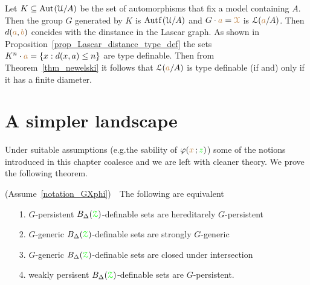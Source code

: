 

\begin{example}
  Let $K\subseteq{\rm Aut\kern.15ex}(\EuScript U/A)$ be the set of automorphisms that fix a model containing $A$.
  Then the group $G$  generated by $K$ is $\mathord{\rm Aut\kern.15ex{f}\kern.15ex}(\EuScript U/A)$ and $G\cdot{\color{brown}a}={\color{brown}\EuScript X}$ is $\EuScript L({\color{brown} a}/A)$.
  Then $d({\color{brown} a},{\color{brown} b})$ concides with the dinstance in the Lascar graph.
  As shown in Proposition~\ref{prop_Lascar_distance_type_def} the sets $K^n\cdot{\color{brown}a}=\{x:d(x,a)\le n\}$ are type definable.
  Then from Theorem~\ref{thm_newelski} it follows that $\EuScript L({\color{brown} a}/A)$ is type definable (if and) only if it has a finite diameter.
\end{example} 

\section{A simpler landscape}

Under suitable assumptions (e.g.\@ the sability of $\varphi({\color{brown} x}\,;{\color{green} z})$) some of the notions introduced in this chapter coalesce and we are left with cleaner theory.
We prove the following theorem.

\begin{theorem}\label{thm_coalesce}
  (Assume~\ref{notation_GXphi})\ \  
  The following are equivalent
  \begin{itemize}
    \item[1.] $G$-persistent $B_\Delta({{\color{green}\EuScript Z}})$-definable sets are hereditarely $G$-persistent
    \item[2.] $G$-generic $B_\Delta({{\color{green}\EuScript Z}})$-definable sets are strongly $G$-generic
    \item[3.] $G$-generic $B_\Delta({{\color{green}\EuScript Z}})$-definable sets are closed under intersection
    \item[4.] weakly persisent $B_\Delta({{\color{green}\EuScript Z}})$-definable sets are $G$-persistent.
  \end{itemize}
\end{theorem}

